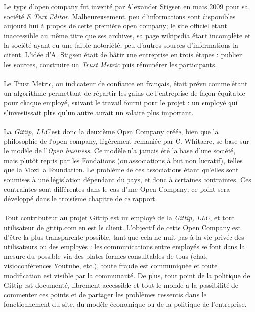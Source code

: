 Le type d'open company fut inventé par Alexander Stigsen en mars 2009 pour sa
société \emph{E Text Editor}. Malheureusement, peu d'informations sont
disponibles aujourd'hui à propos de cette première open company; le site
officiel étant inaccessible au même titre que ses archives, sa page wikipedia
étant incomplète et la société ayant eu une faible notoriété, peu d'autres sources
d'informations la citent. L'idée d'A. Stigsen était de bâtir une entreprise en
trois étapes : publier les sources, construire un \emph{Trust Metric} puis
rémunérer les participants.

\paragraph{}
Le Trust Metric, ou indicateur de confiance en français, était prévu comme
étant un algorithme permettant de répartir les gains de l'entreprise
de façon équitable pour chaque employé, suivant le travail fourni pour
le projet : un employé qui s'investissait plus qu'un autre aurait un salaire
plus important.

\paragraph{}
La \emph{Gittip, LLC} est donc la deuxième Open Company créée, bien que la
philosophie de l'open company, légèrement remaniée par C. Whitacre, se base sur
le modèle de l'\emph{Open business}. Ce modèle n'a jamais été la base d'une
société, mais plutôt repris par les Fondations (ou associations à but non
lucratif), telles que la Mozilla Foundation. Le problème de ces associations
étant qu'elles sont soumises à une législation dépendant du pays, et donc à
certaines contraintes. Ces contraintes sont différentes dans le cas d'une Open
Company; ce point sera développé dans \hyperref[chapter3]{le troisième chapitre
de ce rapport}.

\paragraph{}
Tout contributeur au projet Gittip est un employé de la \emph{Gittip, LLC}, et
tout utilisateur de \url{gittip.com} en est le client. L'objectif de cette Open
Company est d'être la plus transparente possible, tant que cela ne nuit pas à
la vie privée des utilisateurs ou des employés : les communications entre
employés se font dans la mesure du possible via des plates-formes consultables de
tous (chat, visioconférences Youtube, etc.), toute fraude est communiquée
et toute modification est visible par la communauté.
De plus, tout point de la politique de Gittip est documenté, librement accessible
et tout le monde a la possibilité de commenter ces points et de partager les
problèmes ressentis dans le fonctionnement du site, du modèle économique ou de
la politique de l'entreprise.

